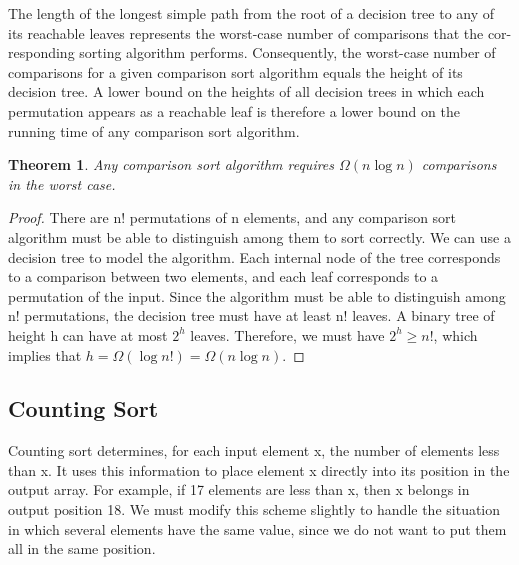 
The length of the longest simple path from the root of a decision tree to any of
its reachable leaves represents the worst-case number of comparisons that the cor-
responding sorting algorithm performs. Consequently, the worst-case number of
comparisons for a given comparison sort algorithm equals the height of its decision
tree. A lower bound on the heights of all decision trees in which each permutation
appears as a reachable leaf is therefore a lower bound on the running time of any
comparison sort algorithm. 

\newtheorem{theorem}{Theorem}[section]
\begin{theorem}
    Any comparison sort algorithm requires $\Omega(n \log n)$ comparisons in the worst case.
\end{theorem}

\begin{proof}
    There are n! permutations of n elements, and any comparison sort algorithm must be able to distinguish among them to sort correctly. We can use a decision tree to model the algorithm. Each internal node of the tree corresponds to a comparison between two elements, and each leaf corresponds to a permutation of the input. Since the algorithm must be able to distinguish among n! permutations, the decision tree must have at least n! leaves. A binary tree of height h can have at most $2^h$ leaves. Therefore, we must have $2^h \geq n!$, which implies that $h = \Omega(\log n!) = \Omega(n \log n)$.
\end{proof}

\newpage

\subsection{Counting Sort}

Counting sort determines, for each input element x, the number of elements less
than x. It uses this information to place element x directly into its position in the
output array. For example, if 17 elements are less than x, then x belongs in output
position 18. We must modify this scheme slightly to handle the situation in which
several elements have the same value, since we do not want to put them all in the
same position.

